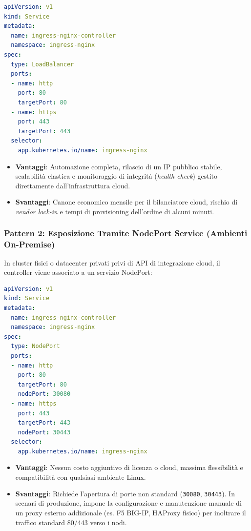 \documentclass[11pt, a4paper]{article}
\begin{document}
\begin{lstlisting}[language=yaml, caption={Ingress Controller esposto via LoadBalancer}]
apiVersion: v1
kind: Service
metadata:
  name: ingress-nginx-controller
  namespace: ingress-nginx
spec:
  type: LoadBalancer
  ports:
  - name: http
    port: 80
    targetPort: 80
  - name: https
    port: 443
    targetPort: 443
  selector:
    app.kubernetes.io/name: ingress-nginx
\end{lstlisting}

\begin{itemize}[noitemsep]
    \item \textbf{Vantaggi}: Automazione completa, rilascio di un IP pubblico stabile, scalabilità elastica e monitoraggio di integrità (\emph{health check}) gestito direttamente dall'infrastruttura cloud.
    \item \textbf{Svantaggi}: Canone economico mensile per il bilanciatore cloud, rischio di \emph{vendor lock-in} e tempi di provisioning dell'ordine di alcuni minuti.
\end{itemize}

\subsubsection{Pattern 2: Esposizione Tramite NodePort Service (Ambienti On-Premise)}
In cluster fisici o datacenter privati privi di API di integrazione cloud, il controller viene associato a un servizio NodePort:

\begin{lstlisting}[language=yaml, caption={Ingress Controller esposto via NodePort}]
apiVersion: v1
kind: Service
metadata:
  name: ingress-nginx-controller
  namespace: ingress-nginx
spec:
  type: NodePort
  ports:
  - name: http
    port: 80
    targetPort: 80
    nodePort: 30080
  - name: https
    port: 443
    targetPort: 443
    nodePort: 30443
  selector:
    app.kubernetes.io/name: ingress-nginx
\end{lstlisting}

\begin{itemize}[noitemsep]
    \item \textbf{Vantaggi}: Nessun costo aggiuntivo di licenza o cloud, massima flessibilità e compatibilità con qualsiasi ambiente Linux.
    \item \textbf{Svantaggi}: Richiede l'apertura di porte non standard (\texttt{30080}, \texttt{30443}). In scenari di produzione, impone la configurazione e manutenzione manuale di un proxy esterno addizionale (es. F5 BIG-IP, HAProxy fisico) per inoltrare il traffico standard 80/443 verso i nodi.
\end{itemize}
\end{document}
